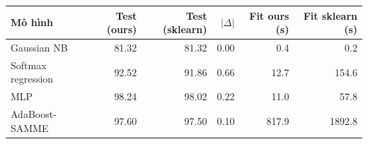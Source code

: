 \begin{tabular}{lrrrrr}
\toprule
Mô hình & Test (ours) & Test (sklearn) & $|\Delta|$ & Fit ours (s) & Fit sklearn (s) \\
\midrule
Gaussian NB & 81.32 & 81.32 & 0.00 & 0.4 & 0.2 \\
Softmax regression & 92.52 & 91.86 & 0.66 & 12.7 & 154.6 \\
MLP & 98.24 & 98.02 & 0.22 & 11.0 & 57.8 \\
AdaBoost-SAMME & 97.60 & 97.50 & 0.10 & 817.9 & 1892.8 \\
\bottomrule
\end{tabular}
